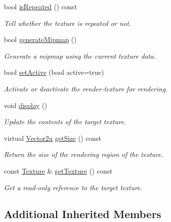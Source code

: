 \begin{DoxyCompactItemize}
bool \hyperlink{classsf_1_1_render_texture_a81c5a453a21c7e78299b062b97dc8c87}{is\+Repeated} () const
\begin{DoxyCompactList}\small\item\em Tell whether the texture is repeated or not. \end{DoxyCompactList}\item 
bool \hyperlink{classsf_1_1_render_texture_a8ca34c8b7e00793c1d3ef4f9a834f8cc}{generate\+Mipmap} ()
\begin{DoxyCompactList}\small\item\em Generate a mipmap using the current texture data. \end{DoxyCompactList}\item 
bool \hyperlink{classsf_1_1_render_texture_a5da95ecdbce615a80bb78399012508cf}{set\+Active} (bool active=true)
\begin{DoxyCompactList}\small\item\em Activate or deactivate the render-\/texture for rendering. \end{DoxyCompactList}\item 
void \hyperlink{classsf_1_1_render_texture_af92886d5faef3916caff9fa9ab32c555}{display} ()
\begin{DoxyCompactList}\small\item\em Update the contents of the target texture. \end{DoxyCompactList}\item 
virtual \hyperlink{classsf_1_1_vector2}{Vector2u} \hyperlink{classsf_1_1_render_texture_a6685315b5c4c25a5dcb75b4280b381ba}{get\+Size} () const
\begin{DoxyCompactList}\small\item\em Return the size of the rendering region of the texture. \end{DoxyCompactList}\item 
const \hyperlink{classsf_1_1_texture}{Texture} \& \hyperlink{classsf_1_1_render_texture_a07ecea85f05932fa02a8279416721bc9}{get\+Texture} () const
\begin{DoxyCompactList}\small\item\em Get a read-\/only reference to the target texture. \end{DoxyCompactList}\end{DoxyCompactItemize}
\subsection*{Additional Inherited Members}


